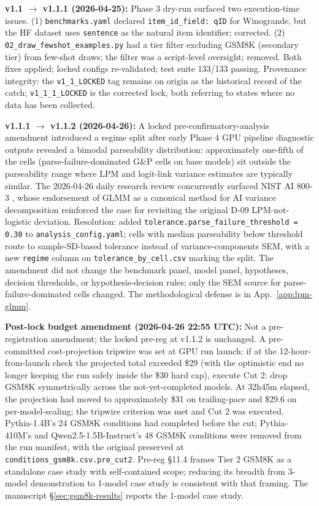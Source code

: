 \documentclass[11pt]{article}
\begin{document}
\textbf{v1.1 $\to$ v1.1.1 (2026-04-25):} Phase 3 dry-run surfaced two execution-time issues. (1) \texttt{benchmarks.yaml} declared \texttt{item\_id\_field: qID} for Winogrande, but the HF dataset uses \texttt{sentence} as the natural item identifier; corrected. (2) \texttt{02\_draw\_fewshot\_examples.py} had a tier filter excluding GSM8K (secondary tier) from few-shot draws; the filter was a script-level oversight; removed. Both fixes applied; locked configs re-validated; test suite 133/133 passing. Provenance integrity: the \texttt{v1\_1\_LOCKED} tag remains on origin as the historical record of the catch; \texttt{v1\_1\_1\_LOCKED} is the corrected lock, both referring to states where no data has been collected.

\textbf{v1.1.1 $\to$ v1.1.2 (2026-04-26):} A locked pre-confirmatory-analysis amendment introduced a regime split after early Phase 4 GPU pipeline diagnostic outputs revealed a bimodal parseability distribution: approximately one-fifth of the cells (parse-failure-dominated G\&P cells on base models) sit outside the parseability range where LPM and logit-link variance estimates are typically similar. The 2026-04-26 daily research review concurrently surfaced NIST AI 800-3 \citep{nist2026statmodels}, whose endorsement of GLMM as a canonical method for AI variance decomposition reinforced the case for revisiting the original D-09 LPM-not-logistic deviation. Resolution: added \texttt{tolerance.parse\_failure\_threshold = 0.30} to \texttt{analysis\_config.yaml}; cells with median parseability below threshold route to sample-SD-based tolerance instead of variance-components SEM, with a new \texttt{regime} column on \texttt{tolerance\_by\_cell.csv} marking the split. The amendment did not change the benchmark panel, model panel, hypotheses, decision thresholds, or hypothesis-decision rules; only the SEM source for parse-failure-dominated cells changed. The methodological defense is in App.~\ref{app:lpm-glmm}.

\textbf{Post-lock budget amendment (2026-04-26 22:55 UTC):} Not a pre-registration amendment; the locked pre-reg at v1.1.2 is unchanged. A pre-committed cost-projection tripwire was set at GPU run launch: if at the 12-hour-from-launch check the projected total exceeded \$29 (with the optimistic end no longer keeping the run safely inside the \$30 hard cap), execute Cut 2: drop GSM8K symmetrically across the not-yet-completed models. At 32h45m elapsed, the projection had moved to approximately \$31 on trailing-pace and \$29.6 on per-model-scaling; the tripwire criterion was met and Cut 2 was executed. Pythia-1.4B's 24 GSM8K conditions had completed before the cut; Pythia-410M's and Qwen2.5-1.5B-Instruct's 48 GSM8K conditions were removed from the run manifest, with the original preserved at \texttt{conditions\_gsm8k.csv.pre\_cut2}. Pre-reg §11.4 frames Tier 2 GSM8K as a standalone case study with self-contained scope; reducing its breadth from 3-model demonstration to 1-model case study is consistent with that framing. The manuscript §\ref{sec:gsm8k-results} reports the 1-model case study.
\end{document}
